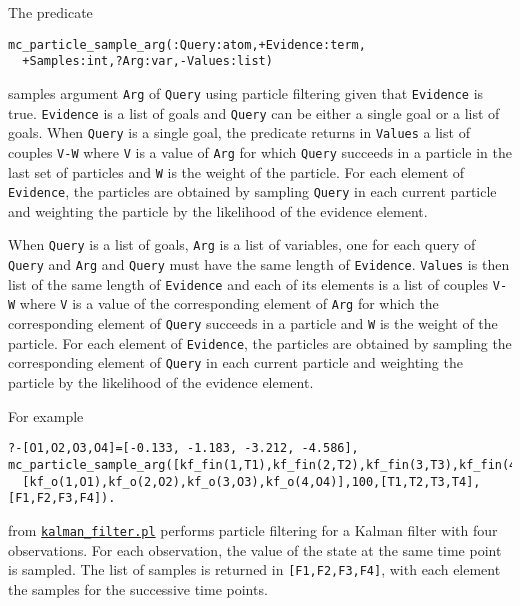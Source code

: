 The predicate
\begin{verbatim}
mc_particle_sample_arg(:Query:atom,+Evidence:term,
  +Samples:int,?Arg:var,-Values:list) 
\end{verbatim}
samples argument \verb|Arg| of \verb|Query| using particle filtering 
given that 
\verb|Evidence|
is true. \verb|Evidence| is a list of goals and \verb|Query| can be either
a single goal or a list of goals.
When \verb|Query| is a single goal, the predicate returns in \verb|Values| a list of couples \verb|V-W| where
\verb|V| is a value of \verb|Arg| for which \verb|Query| succeeds in
a particle in the last set of particles and \verb|W| is the weight of the particle.
For each element of \verb|Evidence|, the particles are obtained by sampling \verb|Query|
in each current particle and weighting the particle by the likelihood of the evidence element.

When \verb|Query| is a list of goals,  \verb|Arg| is a list of variables, one for 
each query of \verb|Query| and \verb|Arg| and \verb|Query| must have the same length of \verb|Evidence|.
\verb|Values| is then list of the same length of \verb|Evidence| and each of its
elements is a list of couples \verb|V-W| where
\verb|V| is a value of the corresponding element of \verb|Arg| for which the corresponding element of
\verb|Query| succeeds in
a particle and \verb|W| is the weight of the particle.
For each element of \verb|Evidence|, the particles are obtained by sampling the corresponding element of \verb|Query|
in each current particle and weighting the particle by the likelihood of the evidence element.


For example
\begin{verbatim}
?-[O1,O2,O3,O4]=[-0.133, -1.183, -3.212, -4.586],
mc_particle_sample_arg([kf_fin(1,T1),kf_fin(2,T2),kf_fin(3,T3),kf_fin(4,T4)],
  [kf_o(1,O1),kf_o(2,O2),kf_o(3,O3),kf_o(4,O4)],100,[T1,T2,T3,T4],[F1,F2,F3,F4]).
\end{verbatim}
from \href{http://cplint.lamping.unife.it/example/inference/kalman_filter.pl}{\texttt{kalman\_filter.pl}} performs
particle filtering for a Kalman filter with four observations. For each observation, the value of the state 
at the same time point is sampled. The list of samples is returned in \verb|[F1,F2,F3,F4]|, with each element
the samples for the successive time points. 
